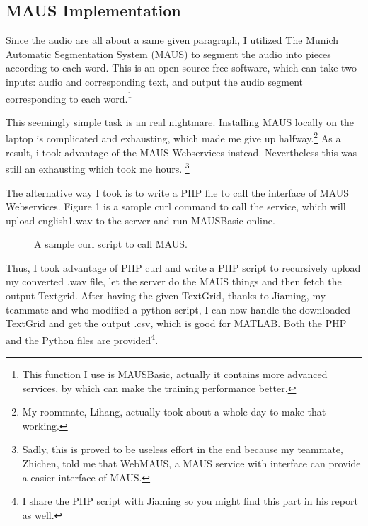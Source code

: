 \documentclass{sig-alternate}
\begin{document}
\subsection{MAUS Implementation}
Since the audio are all about a same given paragraph, I utilized The Munich Automatic Segmentation System (MAUS)\cite{maus} to segment the audio into pieces according to each word. This is an open source free software, which can take two inputs: audio and corresponding text, and output the audio segment corresponding to each word.\footnote{This function I use is MAUSBasic, actually it contains more advanced services, by which can make the training performance better.}

This seemingly simple task is an real nightmare. Installing MAUS locally on the laptop is complicated and exhausting, which made me give up halfway.\footnote{My roommate, Lihang, actually took about a whole day to make that working.} As a result, i took advantage of the MAUS Webservices instead. Nevertheless this was still an exhausting which took me hours. \footnote{Sadly, this is proved to be useless effort in the end because my teammate, Zhichen, told me that WebMAUS, a MAUS service with interface can provide a easier interface of MAUS.}

The alternative way I took is to write a PHP file to call the interface of MAUS Webservices. Figure 1 is a sample curl command to call the service, which will upload english1.wav to the server and run MAUSBasic online.


\begin{figure}
\centering
{}
\caption{A sample curl script to call MAUS.}
\end{figure}

Thus, I took advantage of PHP curl and write a PHP script to recursively upload my converted .wav file, let the server do the MAUS things and then fetch the output Textgrid. After having the given TextGrid, thanks to Jiaming, my teammate and who modified a python script, I can now handle the downloaded TextGrid and get the output .csv, which is good for MATLAB. Both the PHP and the Python files are provided\footnote{I share the PHP script with Jiaming so you might find this part in his report as well.}.
\end{document}
